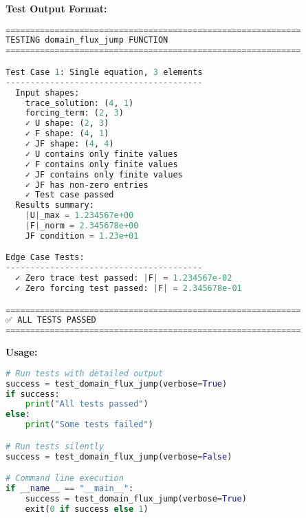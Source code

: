\textbf{Test Output Format:}
\begin{lstlisting}[language=Python, caption=Sample Test Output]
============================================================
TESTING domain_flux_jump FUNCTION
============================================================

Test Case 1: Single equation, 3 elements
----------------------------------------
  Input shapes:
    trace_solution: (4, 1)
    forcing_term: (2, 3)
    ✓ U shape: (2, 3)
    ✓ F shape: (4, 1)
    ✓ JF shape: (4, 4)
    ✓ U contains only finite values
    ✓ F contains only finite values
    ✓ JF contains only finite values
    ✓ JF has non-zero entries
    ✓ Test case passed
  Results summary:
    |U|_max = 1.234567e+00
    |F|_norm = 2.345678e+00
    JF condition = 1.23e+01

Edge Case Tests:
----------------------------------------
  ✓ Zero trace test passed: |F| = 1.234567e-02
  ✓ Zero forcing test passed: |F| = 2.345678e-01

============================================================
✅ ALL TESTS PASSED
============================================================
\end{lstlisting}

\textbf{Usage:}
\begin{lstlisting}[language=Python, caption=Test Function Usage]
# Run tests with detailed output
success = test_domain_flux_jump(verbose=True)
if success:
    print("All tests passed")
else:
    print("Some tests failed")

# Run tests silently
success = test_domain_flux_jump(verbose=False)

# Command line execution
if __name__ == "__main__":
    success = test_domain_flux_jump(verbose=True)
    exit(0 if success else 1)
\end{lstlisting}

